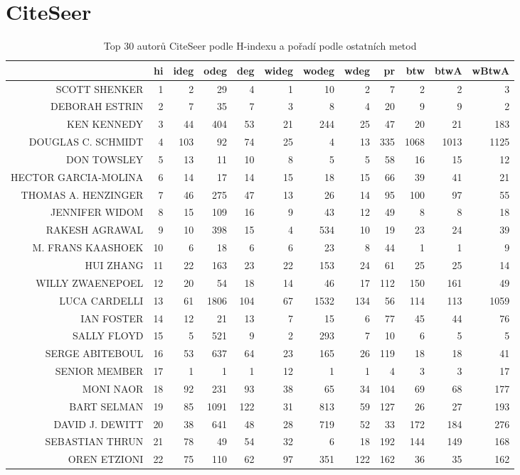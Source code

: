 \documentclass{bakalarka}
\begin{document}
\section{CiteSeer}
\begin{table}[!ht]
\centering
\caption{Top 30 autorů CiteSeer podle H-indexu a pořadí podle ostatních metod}
\label{tab:ranks3}
\begin{sideways}
\begin{scriptsize}
\begin{tabular}{r|r|rrrrrrrrrr}
\toprule
&hi&ideg&odeg&deg&wideg&wodeg&wdeg&pr&btw&btwA&wBtwA\\
\midrule
SCOTT SHENKER&1&2&29&4&1&10&2&7&2&2&3\\
DEBORAH ESTRIN&2&7&35&7&3&8&4&20&9&9&2\\
KEN KENNEDY&3&44&404&53&21&244&25&47&20&21&183\\
DOUGLAS C. SCHMIDT&4&103&92&74&25&4&13&335&1068&1013&1125\\
DON TOWSLEY&5&13&11&10&8&5&5&58&16&15&12\\
HECTOR GARCIA-MOLINA&6&14&17&14&15&18&15&66&39&41&21\\
THOMAS A. HENZINGER&7&46&275&47&13&26&14&95&100&97&55\\
JENNIFER WIDOM&8&15&109&16&9&43&12&49&8&8&18\\
RAKESH AGRAWAL&9&10&398&15&4&534&10&19&23&24&39\\
M. FRANS KAASHOEK&10&6&18&6&6&23&8&44&1&1&9\\
HUI ZHANG&11&22&163&23&22&153&24&61&25&25&14\\
WILLY ZWAENEPOEL&12&20&54&18&14&46&17&112&150&161&49\\
LUCA CARDELLI&13&61&1806&104&67&1532&134&56&114&113&1059\\
IAN FOSTER&14&12&21&13&7&15&6&77&45&44&76\\
SALLY FLOYD&15&5&521&9&2&293&7&10&6&5&5\\
SERGE ABITEBOUL&16&53&637&64&23&165&26&119&18&18&41\\
SENIOR MEMBER&17&1&1&1&12&1&1&4&3&3&17\\
MONI NAOR&18&92&231&93&38&65&34&104&69&68&177\\
BART SELMAN&19&85&1091&122&31&813&59&127&26&27&193\\
DAVID J. DEWITT&20&38&641&48&28&719&52&33&172&184&276\\
SEBASTIAN THRUN&21&78&49&54&32&6&18&192&144&149&168\\
OREN ETZIONI&22&75&110&62&97&351&122&162&36&35&162\\

\end{tabular}
\end{scriptsize}
\end{sideways}
\end{table}
\end{document}
